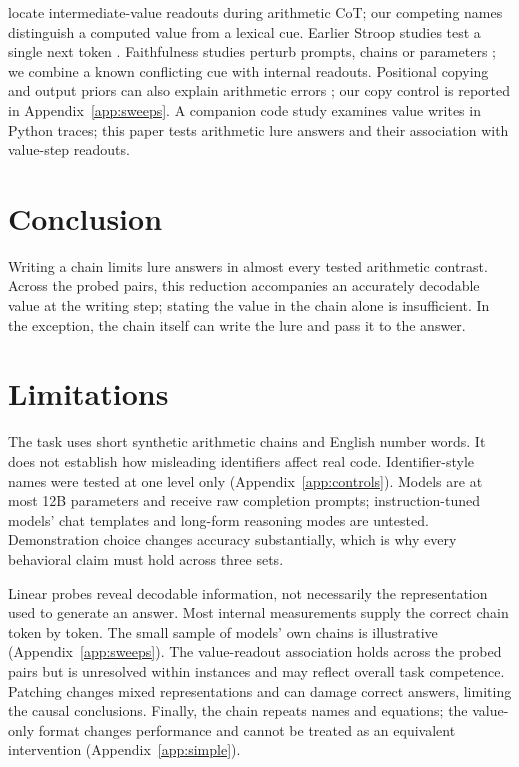 \documentclass[11pt]{article}
\begin{document}
\citet{kudo2026faithful} locate intermediate-value readouts during arithmetic CoT; our competing
names distinguish a computed value from a lexical cue. Earlier Stroop studies test a single next
token \cite{wang2026stroop,hu2026conflict}. Faithfulness studies perturb prompts, chains or
parameters \cite{turpin2023unfaithful,lanham2023measuring,chen2025reasoning,tutek2025unlearning};
we combine a known conflicting cue with internal readouts. Positional copying and output priors
can also explain arithmetic errors \cite{liu2026readout,prabhakar2024deciphering}; our copy
control is reported in Appendix~\ref{app:sweeps}.
A companion code study \citep{anon2026code} examines value writes in Python traces; this
paper tests arithmetic lure answers and their association with value-step readouts.

\section{Conclusion}

Writing a chain limits lure answers in almost every tested arithmetic contrast. Across the
probed pairs, this reduction accompanies an accurately decodable value at the writing step;
stating the value in the chain alone is insufficient. In the exception, the chain itself can
write the lure and pass it to the answer.

\section*{Limitations}

The task uses short synthetic arithmetic chains and English number words. It does not establish
how misleading identifiers affect real code. Identifier-style names were tested at one level
only (Appendix~\ref{app:controls}). Models are at most 12B parameters and receive raw completion
prompts; instruction-tuned models' chat templates and long-form reasoning modes are untested.
Demonstration choice changes accuracy substantially, which is why every behavioral claim must
hold across three sets.

Linear probes reveal decodable information, not necessarily the representation used to generate
an answer. Most internal measurements supply the correct chain token by token. The small sample of
models' own chains is illustrative (Appendix~\ref{app:sweeps}). The value-readout association holds across the probed
pairs but is unresolved within instances and may reflect overall task competence.
Patching changes mixed representations and can damage
correct answers, limiting the causal conclusions. Finally, the chain repeats names and equations;
the value-only format changes performance and cannot be treated as an equivalent intervention
(Appendix~\ref{app:simple}).
\end{document}
